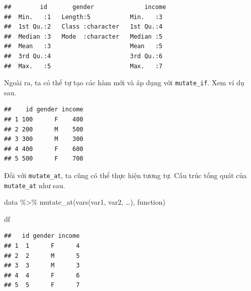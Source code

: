 \documentclass[]{krantz}
\makeatletter
\newenvironment{Shaded}{\begin{snugshade}}{\end{snugshade}}
\newcommand{\CommentTok}[1]{\textcolor[rgb]{0.37,0.37,0.37}{\textit{#1}}}
\newcommand{\ControlFlowTok}[1]{\textcolor[rgb]{0.27,0.27,0.27}{\textbf{#1}}}
\newcommand{\DecValTok}[1]{\textcolor[rgb]{0.06,0.06,0.06}{#1}}
\newcommand{\KeywordTok}[1]{\textcolor[rgb]{0.27,0.27,0.27}{\textbf{#1}}}
\newcommand{\NormalTok}[1]{#1}
\newcommand{\OperatorTok}[1]{\textcolor[rgb]{0.43,0.43,0.43}{\textbf{#1}}}
\newcommand{\StringTok}[1]{\textcolor[rgb]{0.5,0.5,0.5}{#1}}
\renewenvironment{quote}{\begin{VF}}{\end{VF}}
\newenvironment{kframe}{%
\medskip{}
\setlength{\fboxsep}{.8em}
 \def\at@end@of@kframe{}%
 \ifinner\ifhmode%
  \def\at@end@of@kframe{\end{minipage}}%
  \begin{minipage}{\columnwidth}%
 \fi\fi%
 \def\FrameCommand##1{\hskip\@totalleftmargin \hskip-\fboxsep
 \colorbox{shadecolor}{##1}\hskip-\fboxsep
     \hskip-\linewidth \hskip-\@totalleftmargin \hskip\columnwidth}%
 \MakeFramed {\advance\hsize-\width
   \@totalleftmargin\z@ \linewidth\hsize
   \@setminipage}}%
 {\par\unskip\endMakeFramed%
 \at@end@of@kframe}
\renewenvironment{Shaded}{\begin{kframe}}{\end{kframe}}
\renewenvironment{Shaded}{\begin{snugshade}}{\end{snugshade}}
\renewcommand{\CommentTok}[1]{\textcolor[rgb]{0.56,0.35,0.01}{\textit{#1}}}
\renewcommand{\ControlFlowTok}[1]{\textcolor[rgb]{0.13,0.29,0.53}{\textbf{#1}}}
\renewcommand{\DecValTok}[1]{\textcolor[rgb]{0.00,0.00,0.81}{#1}}
\renewcommand{\KeywordTok}[1]{\textcolor[rgb]{0.13,0.29,0.53}{\textbf{#1}}}
\renewcommand{\NormalTok}[1]{#1}
\renewcommand{\OperatorTok}[1]{\textcolor[rgb]{0.81,0.36,0.00}{\textbf{#1}}}
\renewcommand{\StringTok}[1]{\textcolor[rgb]{0.31,0.60,0.02}{#1}}
\theoremstyle{definition}
\theoremstyle{definition}
\theoremstyle{definition}
\theoremstyle{remark}
\makeatother
\begin{document}
\begin{verbatim}
##        id       gender              income 
##  Min.   :1   Length:5           Min.   :3  
##  1st Qu.:2   Class :character   1st Qu.:4  
##  Median :3   Mode  :character   Median :5  
##  Mean   :3                      Mean   :5  
##  3rd Qu.:4                      3rd Qu.:6  
##  Max.   :5                      Max.   :7
\end{verbatim}

Ngoài ra, ta có thể tự tạo các hàm mới và áp dụng với
\texttt{mutate\_if}. Xem ví dụ sau.

\begin{Shaded}
\end{Shaded}

\begin{verbatim}
##    id gender income
## 1 100      F    400
## 2 200      M    500
## 3 300      M    300
## 4 400      F    600
## 5 500      F    700
\end{verbatim}

Đối với \texttt{mutate\_at}, ta cũng có thể thực hiện tương tự. Cấu trúc
tổng quát của \texttt{mutate\_at} như sau.

\begin{quote}
data \%\textgreater{}\% mutate\_at(vars(var1, var2, \ldots{}), function)
\end{quote}

\begin{Shaded}
\begin{Highlighting}[]
\NormalTok{df }
\end{Highlighting}
\end{Shaded}

\begin{verbatim}
##   id gender income
## 1  1      F      4
## 2  2      M      5
## 3  3      M      3
## 4  4      F      6
## 5  5      F      7
\end{verbatim}

\begin{Shaded}
\end{Shaded}
\end{document}

